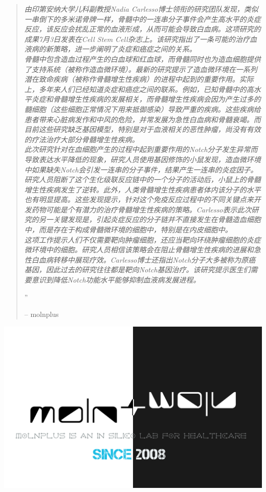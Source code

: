 \documentclass[10pt,a4paper]{article}
\begin{document}
\begin{multicols}{2}
\begin{quotation}
\noindent\normalsize\textit{由印第安纳大学儿科副教授Nadia Carlesso博士领衔的研究团队发现，类似一串倒下的多米诺骨牌一样，骨髓中的一连串分子事件会产生高水平的炎症反应，该反应会扰乱正常的血液形成，从而可能会导致白血病。这项研究的成果7月3日发表在Cell Stem Cell杂志上。该研究指出了一条可能的治疗血液病的新策略，进一步阐明了炎症和癌症之间的关系。\\
骨髓中包含造血过程产生的白血球和红血球，而骨髓同时也为造血细胞提供了支持系统（被称作造血微环境）。最新的研究提示了造血微环境在一系列潜在致命疾病（被称作骨髓增生性疾病）的进程中起到的重要作用。实际上，多年来人们已经知道炎症和癌症之间的联系。例如，已知骨髓中的高水平炎症和骨髓增生性疾病的发展相关，而骨髓增生性疾病会因为产生过多的髓细胞（这些细胞正常情况下用来抵御感染）导致严重的疾病。这些疾病给患者带来心脏病发作和中风的危险，并常发展为急性白血病和骨髓衰竭。而目前这些研究缺乏基因模型，特别是对于血液相关的恶性肿瘤，尚没有有效的疗法治疗大部分骨髓增生性疾病。\\
此次研究针对在血细胞产生的过程中起到重要作用的Notch分子发生异常而导致表达水平降低的现象，研究人员使用基因修饰的小鼠发现，造血微环境中如果缺失Notch会引发一连串的分子事件，结果产生一连串的炎症因子。研究人员阻断了这个生化级联反应链中的一个分子的活动后，小鼠上的骨髓增生性疾病发生了逆转。此外，人类骨髓增生性疾病患者体内该分子的水平也有明显提高。这些发现提示，针对这个免疫反应过程中的不同关键点来开发药物可能是个有潜力的治疗骨髓增生性疾病的策略。Carlesso表示此次研究的另一关键发现是，引起炎症反应的分子链并不直接发生在骨髓造血细胞中，而是存在于构成骨髓微环境的细胞中，特别是在内皮细胞中。\\
这项工作提示人们不仅需要靶向肿瘤细胞，还应当靶向环绕肿瘤细胞的炎症微环境中的细胞。研究人员相信该策略会在阻止骨髓增生性疾病的进展和急性白血病转移中展现疗效。Carlesso博士还指出Notch分子大多被称为原癌基因，因此过去的研究往往都是靶向Notch基因治疗。该研究提示医生们需要意识到降低Notch功能水平能够抑制血液病发展进程。}


\hfill{\Huge''}

\hfill-- molnplus
\end{quotation}








\begin{center}
\includegraphics[width=0.8\linewidth]{molnplus.png} %
\end{center}


\end{multicols}

\newpage


\end{document}
